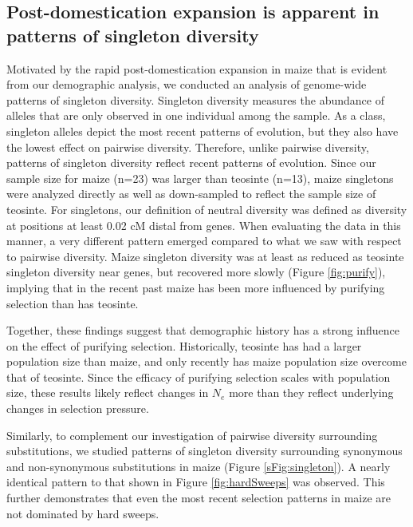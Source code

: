 \documentclass{pnastwo}
\begin{document}
\begin{article}
\subsection{Post-domestication expansion is apparent in patterns of singleton diversity}
Motivated by the rapid post-domestication expansion in maize that is evident from our demographic analysis, we conducted an analysis of genome-wide patterns of singleton diversity. Singleton diversity measures the abundance of alleles that are only observed in one individual among the sample. As a class, singleton alleles depict the most recent patterns of evolution, but
they also have the lowest effect on pairwise diversity. Therefore, unlike
pairwise diversity, patterns of singleton
diversity reflect recent patterns of evolution. Since our sample size
for maize (n=23) was larger than teosinte (n=13), maize singletons were
analyzed directly as well as down-sampled to reflect the sample size of
teosinte. For singletons, our definition of
neutral diversity was defined as diversity at positions at
least 0.02 cM distal from genes. When
evaluating the data in this manner, a very different pattern
emerged compared to what we saw with respect to pairwise diversity. Maize singleton diversity was at least as reduced as teosinte singleton
diversity near genes, but recovered more slowly
(Figure \ref{fig:purify}), implying that in the
recent past maize has been more influenced by purifying selection than has
teosinte.

Together, these findings suggest that demographic history has
a strong influence on the effect of purifying selection. Historically,
teosinte has had a larger population size than maize, and only
recently has maize population size overcome that of teosinte. Since
the efficacy of purifying selection scales with population size,
these results likely reflect changes in $N_e$ more than they reflect
underlying changes in selection pressure.

Similarly, to complement our investigation of pairwise diversity surrounding substitutions, we studied patterns of singleton diversity surrounding synonymous and non-synonymous substitutions in maize (Figure \ref{sFig:singleton}). A nearly identical pattern to that shown in Figure \ref{fig:hardSweeps} was observed. This further demonstrates that even the most recent selection patterns in maize are not dominated by hard sweeps.




\end{article}
\end{document}

